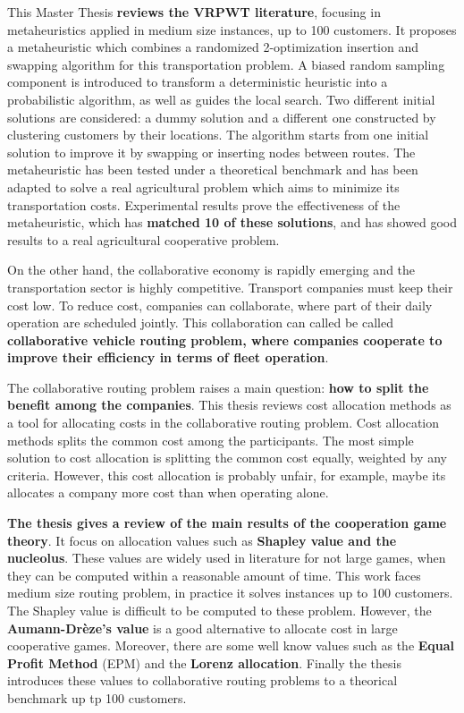 This Master Thesis \textbf{reviews the VRPWT literature}, focusing in metaheuristics applied in medium size instances, up to 100 customers. It proposes a metaheuristic which combines a randomized 2-optimization insertion and swapping algorithm for this transportation problem. A biased random sampling component is introduced to transform a deterministic heuristic into a probabilistic algorithm, as well as guides the local search. Two different initial solutions are considered: a dummy solution and a different one constructed by clustering customers by their locations. The algorithm starts from one initial solution to improve it by swapping or inserting nodes between routes. The metaheuristic has been tested under a theoretical benchmark and has been adapted to solve a real agricultural problem which aims to minimize its transportation costs. Experimental results prove the effectiveness of the metaheuristic, which has \textbf{matched 10 of these solutions}, and has showed good results to a real agricultural cooperative problem. 

On the other hand, the collaborative economy is rapidly emerging and the transportation sector is highly competitive. Transport companies must keep their cost low. To reduce cost, companies can collaborate, where part of their daily operation are scheduled jointly. This collaboration can called be called \textbf{collaborative vehicle routing problem, where companies cooperate to improve their efficiency in terms of fleet operation}.

The collaborative routing problem raises a main question: \textbf{how to split the benefit among the companies}. This thesis reviews cost allocation methods as a tool for allocating costs in the collaborative routing problem. Cost allocation methods splits the common cost among the participants. The most simple solution to cost allocation is splitting the common cost equally, weighted by any criteria. However, this cost allocation is probably unfair, for example, maybe its allocates a company more cost than when operating alone. 

\textbf{The thesis gives a review of the main results of the cooperation game theory}. It focus on allocation values such as \textbf{Shapley value and the nucleolus}. These values are widely used in literature for not large games, when they can be computed within a reasonable amount of time. This work faces medium size routing problem, in practice it solves instances up to 100 customers. The Shapley value is difficult to be computed to these problem. However, the \textbf{Aumann-Dr\`eze's value} is a good alternative to allocate cost in large cooperative games. Moreover, there are some well know values such as the \textbf{Equal Profit Method} (EPM) and the \textbf{Lorenz allocation}. Finally the thesis introduces these values to collaborative routing problems to a theorical benchmark up tp 100 customers.


